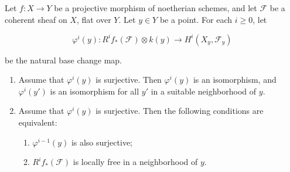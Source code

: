 Let $f: X \to Y$ be a projective morphism of noetherian schemes, and let $\mathcal{F}$ be a coherent sheaf on $X$, flat over $Y$. Let $y \in Y$ be a point. For each $i \geq 0$, let

$$\varphi^i(y): R^i f_*(\mathcal{F}) \otimes k(y) \to H^i(X_y, \mathcal{F}_y)$$

be the natural base change map.

\begin{enumerate}
\item[(a)] Assume that $\varphi^i(y)$ is surjective. Then $\varphi^i(y)$ is an isomorphism, and $\varphi^i(y')$ is an isomorphism for all $y'$ in a suitable neighborhood of $y$.

\item[(b)] Assume that $\varphi^i(y)$ is surjective. Then the following conditions are equivalent:
\begin{enumerate}
\item[(i)] $\varphi^{i-1}(y)$ is also surjective;
\item[(ii)] $R^i f_*(\mathcal{F})$ is locally free in a neighborhood of $y$.
\end{enumerate}
\end{enumerate}

